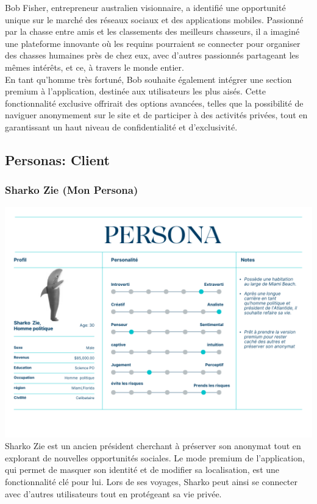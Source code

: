 \documentclass{article}
\begin{document}
Bob Fisher, entrepreneur australien visionnaire, a identifié une opportunité unique sur le marché 
des réseaux sociaux et des applications mobiles. Passionné par la chasse entre amis et les classements 
des meilleurs chasseurs, il a imaginé une plateforme innovante où les requins pourraient se connecter
pour organiser des chasses humaines près de chez eux, avec d’autres passionnés partageant les mêmes 
intérêts, et ce, à travers le monde entier.\\

En tant qu’homme très fortuné, Bob souhaite également intégrer une section premium à l’application, 
destinée aux utilisateurs les plus aisés. Cette fonctionnalité exclusive offrirait des options
avancées, telles que la possibilité de naviguer anonymement sur le site et de participer à 
des activités privées, tout en garantissant un haut niveau de confidentialité et d’exclusivité.

\subsection{Personas: Client}
\subsubsection*{Sharko Zie (Mon Persona)}
\includegraphics[width=1\textwidth]{photo/Personna_Sharkozie.png}\\

Sharko Zie est un ancien président cherchant à préserver son anonymat tout en explorant de nouvelles 
opportunités sociales. 
Le mode premium de l'application, qui permet de masquer son identité et de modifier sa localisation,
 est une fonctionnalité clé pour lui. 
Lors de ses voyages, Sharko peut ainsi se connecter avec d'autres utilisateurs tout en protégeant
 sa vie privée. 
\end{document}
